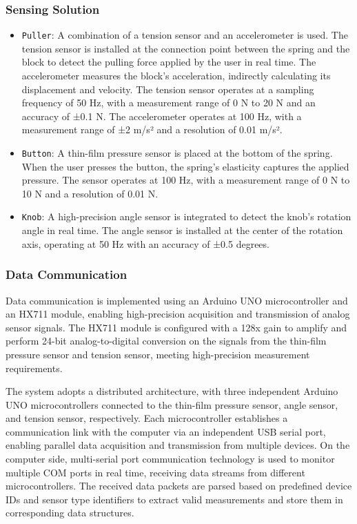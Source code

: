 \documentclass[sigconf,review,anonymous]{acmart}
\begin{document}
\subsubsection{Sensing Solution}
\begin{itemize}
  \item {\texttt{Puller}}: A combination of a tension sensor and an accelerometer is used. The tension sensor is installed at the connection point between the spring and the block to detect the pulling force applied by the user in real time. The accelerometer measures the block's acceleration, indirectly calculating its displacement and velocity. The tension sensor operates at a sampling frequency of 50 Hz, with a measurement range of 0 N to 20 N and an accuracy of ±0.1 N. The accelerometer operates at 100 Hz, with a measurement range of ±2 m/s² and a resolution of 0.01 m/s².

  \item {\texttt{Button}}: A thin-film pressure sensor is placed at the bottom of the spring. When the user presses the button, the spring's elasticity captures the applied pressure. The sensor operates at 100 Hz, with a measurement range of 0 N to 10 N and a resolution of 0.01 N.

  \item {\texttt{Knob}}: A high-precision angle sensor is integrated to detect the knob's rotation angle in real time. The angle sensor is installed at the center of the rotation axis, operating at 50 Hz with an accuracy of ±0.5 degrees.
\end{itemize}

\subsubsection{Data Communication}
Data communication is implemented using an Arduino UNO microcontroller and an HX711 module, enabling high-precision acquisition and transmission of analog sensor signals. The HX711 module is configured with a 128x gain to amplify and perform 24-bit analog-to-digital conversion on the signals from the thin-film pressure sensor and tension sensor, meeting high-precision measurement requirements.

The system adopts a distributed architecture, with three independent Arduino UNO microcontrollers connected to the thin-film pressure sensor, angle sensor, and tension sensor, respectively. Each microcontroller establishes a communication link with the computer via an independent USB serial port, enabling parallel data acquisition and transmission from multiple devices. On the computer side, multi-serial port communication technology is used to monitor multiple COM ports in real time, receiving data streams from different microcontrollers. The received data packets are parsed based on predefined device IDs and sensor type identifiers to extract valid measurements and store them in corresponding data structures.
\end{document}
